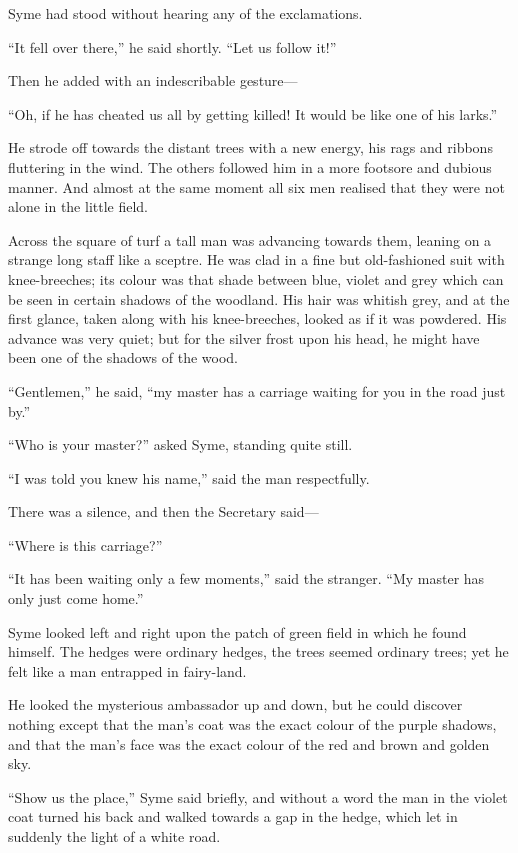 \documentclass{book}
\begin{document}
Syme had stood without hearing any of the exclamations.

“It fell over there,” he said shortly. “Let us follow it!”

Then he added with an indescribable gesture—

“Oh, if he has cheated us all by getting killed! It would be like one of his larks.”

He strode off towards the distant trees with a new energy, his rags and ribbons fluttering in the wind. The others followed him in a more footsore and dubious manner. And almost at the same moment all six men realised that they were not alone in the little field.

Across the square of turf a tall man was advancing towards them, leaning on a strange long staff like a sceptre. He was clad in a fine but old-fashioned suit with knee-breeches; its colour was that shade between blue, violet and grey which can be seen in certain shadows of the woodland. His hair was whitish grey, and at the first glance, taken along with his knee-breeches, looked as if it was powdered. His advance was very quiet; but for the silver frost upon his head, he might have been one of the shadows of the wood.

“Gentlemen,” he said, “my master has a carriage waiting for you in the road just by.”

“Who is your master?” asked Syme, standing quite still.

“I was told you knew his name,” said the man respectfully.

There was a silence, and then the Secretary said—

“Where is this carriage?”

“It has been waiting only a few moments,” said the stranger. “My master has only just come home.”

Syme looked left and right upon the patch of green field in which he found himself. The hedges were ordinary hedges, the trees seemed ordinary trees; yet he felt like a man entrapped in fairy-land.

He looked the mysterious ambassador up and down, but he could discover nothing except that the man’s coat was the exact colour of the purple shadows, and that the man’s face was the exact colour of the red and brown and golden sky.

“Show us the place,” Syme said briefly, and without a word the man in the violet coat turned his back and walked towards a gap in the hedge, which let in suddenly the light of a white road.
\end{document}
